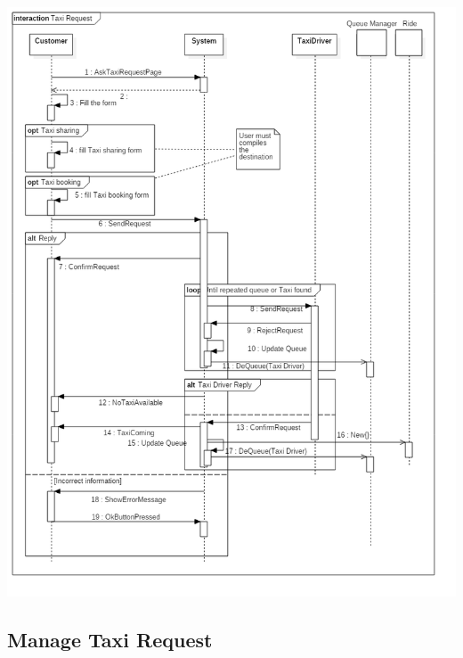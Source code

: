 \documentclass[english]{article}
\begin{document}
\includegraphics[width=\textwidth]{TaxiRequest}

\subsection{Manage Taxi Request}
\end{document}
